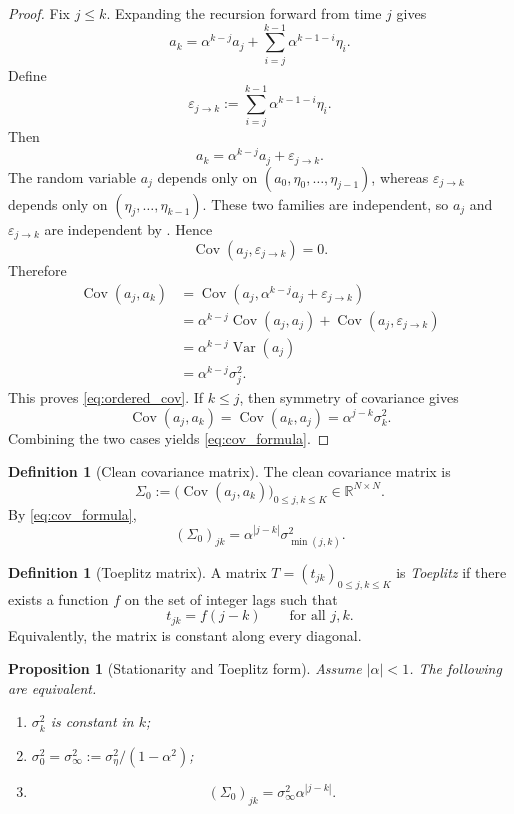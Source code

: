\documentclass[11pt]{article}
\numberwithin{equation}{section}
\newtheorem{proposition}[theorem]{Proposition}
\theoremstyle{definition}
\newtheorem{definition}[theorem]{Definition}
\theoremstyle{remark}
\newcommand{\R}{\mathbb{R}}
\newcommand{\Var}{\operatorname{Var}}
\newcommand{\Cov}{\operatorname{Cov}}
\begin{document}
\begin{proof}
Fix $j\leq k$. Expanding the recursion forward from time $j$ gives
\[
a_k=\alpha^{k-j}a_j+\sum_{i=j}^{k-1}\alpha^{k-1-i}\eta_i.
\]
Define
\[
\varepsilon_{j\to k}:=\sum_{i=j}^{k-1}\alpha^{k-1-i}\eta_i.
\]
Then
\[
a_k=\alpha^{k-j}a_j+\varepsilon_{j\to k}.
\]
The random variable $a_j$ depends only on $(a_0,\eta_0,\dots,\eta_{j-1})$, whereas $\varepsilon_{j\to k}$ depends only on $(\eta_j,\dots,\eta_{k-1})$. These two families are independent, so $a_j$ and $\varepsilon_{j\to k}$ are independent by . Hence
\[
\Cov(a_j,\varepsilon_{j\to k})=0.
\]
Therefore
\begin{align*}
\Cov(a_j,a_k)
&=\Cov(a_j,\alpha^{k-j}a_j+\varepsilon_{j\to k}) \\
&=\alpha^{k-j}\Cov(a_j,a_j)+\Cov(a_j,\varepsilon_{j\to k}) \\
&=\alpha^{k-j}\Var(a_j) \\
&=\alpha^{k-j}\sigma_j^2.
\end{align*}
This proves \eqref{eq:ordered_cov}. If $k\leq j$, then symmetry of covariance gives
\[
\Cov(a_j,a_k)=\Cov(a_k,a_j)=\alpha^{j-k}\sigma_k^2.
\]
Combining the two cases yields \eqref{eq:cov_formula}.
\end{proof}

\begin{definition}[Clean covariance matrix]
The clean covariance matrix is
\begin{equation}\label{eq:sigma0_def}
\Sigma_0:=\big(\Cov(a_j,a_k)\big)_{0\leq j,k\leq K}\in\R^{N\times N}.
\end{equation}
By \eqref{eq:cov_formula},
\begin{equation}\label{eq:sigma0_entries}
(\Sigma_0)_{jk}=\alpha^{|j-k|}\sigma_{\min(j,k)}^2.
\end{equation}
\end{definition}

\begin{definition}[Toeplitz matrix]
A matrix $T=(t_{jk})_{0\leq j,k\leq K}$ is \emph{Toeplitz} if there exists a function $f$ on the set of integer lags such that
\[
t_{jk}=f(j-k)
\qquad\text{for all }j,k.
\]
Equivalently, the matrix is constant along every diagonal.
\end{definition}

\begin{proposition}[Stationarity and Toeplitz form]\label{prop:stationary_toeplitz}
Assume $|\alpha|<1$. The following are equivalent.
\begin{enumerate}[label=(\alph*),leftmargin=1.2cm]
\item $\sigma_k^2$ is constant in $k$;
\item $\sigma_0^2=\sigma_\infty^2:=\sigma_\eta^2/(1-\alpha^2)$;
\item
\begin{equation}\label{eq:stationary_cov_matrix}
(\Sigma_0)_{jk}=\sigma_\infty^2\alpha^{|j-k|}.
\end{equation}
\end{enumerate}
\end{proposition}
\end{document}
